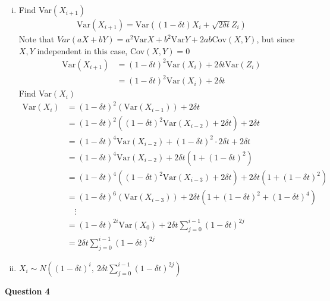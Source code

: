 \documentclass[12pt, letterpaper]{article}
\begin{document}
\begin{enumerate}[a.]
\begin{enumerate}[i.]
\begin{align*}
            \mathbb{E}(X_i) &= (1-\delta t) \mathbb{E}(X_{i-1}) \\
            &= (1-\delta t)^2\mathbb{E}(X_{i-2}) \\
            &\quad \vdots \\
            &= (1-\delta t)^i\mathbb{E}(X_{0}) \\
            &= (1-\delta t)^i \quad \text{ since } \mathbb{E}(X_0) = 1
        \end{align*}
        \item Find Var$(X_{i+1})$
        \begin{align*}
            \text{Var}(X_{i+1}) = \text{Var}((1-\delta t)X_i + \sqrt{2\delta t}Z_i)
        \end{align*}
        Note that $Var(aX + bY) = a^2\text{Var}X + b^2\text{Var}Y + 2ab\text{Cov}(X,Y)$,
        but since $X,Y$ independent in this case, Cov$(X,Y) = 0$
        \begin{align*}
            \text{Var}(X_{i+1}) &= (1-\delta t)^2\text{Var}(X_i) +2\delta t \text{Var}(Z_i) \\
            &= (1-\delta t)^2\text{Var}(X_i) + 2\delta t
        \end{align*}
        Find Var$(X_i)$
        \begin{align*}
            \text{Var}(X_i) &= (1-\delta t)^2(\text{Var}(X_{i-1})) + 2\delta t \\
            &= (1-\delta t)^2((1-\delta t)^2 \text{Var}(X_{i-2}) + 2\delta t) + 2\delta t \\
            &= (1-\delta t)^4\text{Var}(X_{i-2}) + (1-\delta t)^2 \cdot 2\delta t + 2\delta t \\
            &= (1-\delta t)^4\text{Var}(X_{i-2}) + 2\delta t (1+(1-\delta t)^2) \\
            &= (1-\delta t)^4((1-\delta t)^2\text{Var}(X_{i-3})+2\delta t ) + 2\delta t (1+(1-\delta t)^2) \\
            &= (1-\delta t)^6(\text{Var}(X_{i-3})) + 2\delta t (1+(1-\delta t)^2 + (1-\delta t)^4) \\
            &\quad \vdots \\
            &= (1-\delta t)^{2i} \text{Var}(X_0) + 2\delta t \sum_{j=0}^{i-1}(1-\delta t)^{2j} \\
            &= 2\delta t \sum_{j=0}^{i-1}(1-\delta t)^{2j}
        \end{align*}
        \item $X_i \sim N\left((1-\delta t)^i,\ 2\delta t \sum_{j=0}^{i-1}(1-\delta t)^{2j}\right)$
    \end{enumerate}
\end{enumerate}
\newpage
\noindent \textbf{Question 4} \\
\end{document}

